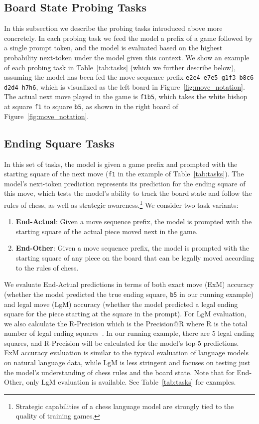 \documentclass[12pt]{thesis-umich}[thesis]
\newcommand{\pos}[1]{\texttt{#1}}
\newcommand{\legalmove}{LgM\xspace}
\newcommand{\exactmove}{ExM\xspace}
\begin{document}
 \subsection{Board State Probing Tasks}
\label{sec:cloze}
In this subsection we describe the probing tasks introduced above more concretely. In each probing task we feed the model a prefix of a game followed by a single prompt token, and the model is evaluated based on the highest probability next-token under the model given this context. We show an example of each probing task in Table~\ref{tab:tasks} (which we further describe below), assuming the model has been fed the move sequence prefix \pos{e2e4 e7e5 g1f3 b8c6 d2d4 h7h6}, which is visualized as the left board in Figure~\ref{fig:move_notation}. The actual next move played in the game is \pos{f1b5}, which takes the white bishop at square \pos{f1} to square \pos{b5}, as shown in the right board of Figure~\ref{fig:move_notation}. 


\subsection{Ending Square Tasks}
In this set of tasks, the model is given a game prefix and prompted with the starting square of the next move (\pos{f1} in the example of Table~\ref{tab:tasks}). The model's next-token prediction represents its prediction for the ending square of this move,
which
tests the model's ability to track the board state and follow
the rules of chess,
as well as strategic awareness.\footnote{Strategic capabilities of a chess language model are strongly tied to the quality of training games.}  We consider two task variants: \begin{enumerate}
	\item \textbf{End-Actual}: Given a move sequence prefix, the model is prompted with the starting square of the actual piece moved next in the game. \item \textbf{End-Other}: Given a move sequence prefix, the model is prompted with the starting square of any piece on the board that can be legally moved according to the rules of chess. 
\end{enumerate}
We evaluate End-Actual predictions in terms of both exact move (\exactmove) accuracy (whether the model predicted the true ending square, \pos{b5} in our running example) and legal move (\legalmove) accuracy (whether the model predicted a legal ending square for the piece starting at the square in the prompt). 
For \legalmove evaluation, we also calculate the R-Precision which is the Precision@R where R is the total number of legal ending squares~\cite{ir-book}. In our running example, there are 5 legal ending squares, and R-Precision will be calculated for the model's top-5 predictions.
\exactmove accuracy evaluation is similar to the typical evaluation of language models on natural language data, while \legalmove is less stringent and focuses on testing just the model's understanding of chess rules and the board state. Note that for End-Other, only \legalmove evaluation is available. See Table~\ref{tab:tasks} for examples.
\end{document}
